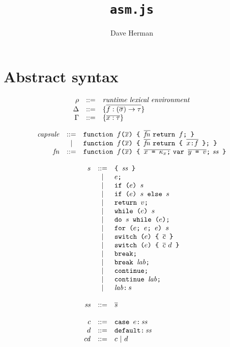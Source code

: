 \documentclass{article}
\newcommand{\funty}[2]{({#1}) \rightarrow {#2}}
\newcommand{\seq}[1]{\overline{{#1}}}
\newcommand{\mathjs}[1]{\mbox{\texttt{{#1}}}}
\newcommand{\return}[1]{\mathjs{return }{#1}\mathjs{;}}
\newcommand{\fun}[3]{\mathjs{function }{#1}\mathjs{(}{#2}\mathjs{) \{ }{#3}\mathjs{ \}}}
\newcommand{\var}[1]{\mathjs{var }{#1}\mathjs{;}}
\newcommand{\while}[2]{\mathjs{while (}{#1}\mathjs{) }{#2}}
\newcommand{\dowhile}[2]{\mathjs{do }{#1}\mathjs{ while (}{#2}\mathjs{);}}
\newcommand{\for}[4]{\mathjs{for (}{#1}\mathjs{; }{#2}\mathjs{; }{#3}\mathjs{) }{#4}}
\newcommand{\switch}[2]{\mathjs{switch (}{#1}\mathjs{) \{ }{#2}\mathjs{ \}}}
\newcommand{\brk}{\mathjs{break;}}
\newcommand{\brkl}[1]{\mathjs{break }{#1}\mathjs{;}}
\newcommand{\cont}{\mathjs{continue;}}
\newcommand{\contl}[1]{\mathjs{continue }{#1}\mathjs{;}}
\newcommand{\lab}[2]{{#1}\mathjs{:}\,{#2}}
\newcommand{\ifthen}[2]{\mathjs{if (}{#1}\mathjs{) }{#2}}
\newcommand{\ifthenelse}[3]{\mathjs{if (}{#1}\mathjs{) }{#2}\mathjs{ else }{#3}}
\newcommand{\block}[1]{\mathjs{\{ }{#1}\mathjs{ \}}}
\begin{document}
\title{\texttt{asm.js}}
\author{Dave Herman}
\maketitle

\section{Abstract syntax}

\[
\begin{array}{rcl}
\rho & ::= & \mbox{\textit{runtime lexical environment}} \\
\Delta & ::= & \{ \seq{f : \funty{\seq{\sigma}}{\tau} } \} \\
\Gamma & ::= & \{ \seq{x : \tau} \} \\
\end{array}
\]

\[
\begin{array}{rcl}
\mathit{capsule} & ::= & \fun{f}{\seq{x}}{\seq{\mathit{fn}}\ \return{f}} \\
                 &  |  & \fun{f}{\seq{x}}{\seq{\mathit{fn}}\ \return{\mathjs{\{ } \seq{x \mathjs{:} f} \mathjs{ \}}}} \\
\mathit{fn} & ::= & \fun{f}{\seq{x}}{\seq{x\mathjs{ = }\kappa_x\mathjs{;}}\ \var{\seq{y\mathjs{ = }v}}\ \mathit{ss}} \\
\end{array}
\]

\[
\begin{array}{rcl}
s & ::= & \block{\mathit{ss}} \\
  &  |  & e\mathjs{;} \\
  &  |  & \ifthen{e}{s} \\
  &  |  & \ifthenelse{e}{s}{s} \\
  &  |  & \return{v} \\
  &  |  & \while{e}{s} \\
  &  |  & \dowhile{s}{e} \\
  &  |  & \for{e}{e}{e}{s} \\
  &  |  & \switch{e}{\seq{c}} \\
  &  |  & \switch{e}{\seq{c}\ d} \\
  &  |  & \brk \\
  &  |  & \brkl{\mathit{lab}} \\
  &  |  & \cont \\
  &  |  & \contl{\mathit{lab}} \\
  &  |  & \lab{\mathit{lab}}{s} \\
\\
\mathit{ss} & ::= & \seq{s} \\
\\
c & ::= & \mathjs{case }e\mathjs{:}\,\mathit{ss} \\
d & ::= & \mathjs{default:}\,\mathit{ss} \\
\mathit{cd} & ::= & c ~|~ d \\
\end{array}
\]
\end{document}
